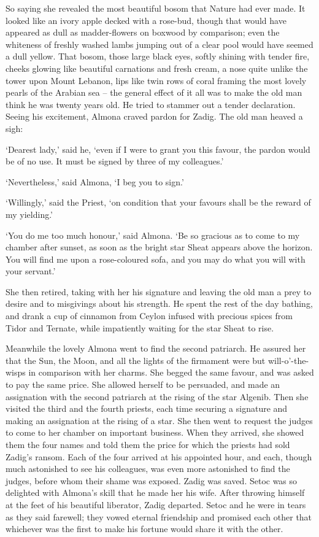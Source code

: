 \documentclass{article}
\begin{document}
\begin{center}
So saying she revealed the most beautiful bosom that Nature had ever made. It looked 
like an ivory apple decked with a rose-bud, though that would have appeared as 
dull as madder-flowers on boxwood by comparison; even the whiteness of freshly 
washed lambs jumping out of a clear pool would have seemed a dull yellow. That 
bosom, those large black eyes, softly shining with tender fire, cheeks glowing 
like beautiful carnations and fresh cream, a nose quite unlike the tower upon Mount 
Lebanon, lips like twin rows of coral framing the most lovely pearls of the Arabian 
sea – the general effect of it all was to make the old man think he was twenty 
years old. He tried to stammer out a tender declaration. Seeing his excitement, 
Almona craved pardon for Zadig. The old man heaved a sigh: 

`Dearest lady,' said he, `even if I were to grant you this favour, the pardon would 
be of no use. It must be signed by three of my colleagues.' 

`Nevertheless,' said Almona, `I beg you to sign.' 

`Willingly,' said the Priest, `on condition that your favours shall be the reward 
of my yielding.' 

`You do me too much honour,' said Almona. `Be so gracious as to come to my chamber 
after sunset, as soon as the bright star Sheat appears above the horizon. You will 
find me upon a rose-coloured sofa, and you may do what you will with your servant.' 

She then retired, taking with her his signature and leaving the old man a prey 
to desire and to misgivings about his strength. He spent the rest of the day bathing, 
and drank a cup of cinnamon from Ceylon infused with precious spices from Tidor 
and Ternate, while impatiently waiting for the star Sheat to rise. 

Meanwhile the lovely Almona went to find the second patriarch. He assured her that 
the Sun, the Moon, and all the lights of the firmament were but will-o'-the-wisps 
in comparison with her charms. She begged the same favour, and was asked to pay 
the same price. She allowed herself to be persuaded, and made an assignation with 
the second patriarch at the rising of the star Algenib. Then she visited the third 
and the fourth priests, each time securing a signature and making an assignation 
at the rising of a star. She then went to request the judges to come to her chamber 
on important business. When they arrived, she showed them the four names and told 
them the price for which the priests had sold Zadig's ransom. Each of the four 
arrived at his appointed hour, and each, though much astonished to see his colleagues, 
was even more astonished to find the judges, before whom their shame was exposed. 
Zadig was saved. Setoc was so delighted with Almona's skill that he made her his 
wife. After throwing himself at the feet of his beautiful liberator, Zadig departed. 
Setoc and he were in tears as they said farewell; they vowed eternal friendship 
and promised each other that whichever was the first to make his fortune would 
share it with the other. 


\end{center}
\end{document}
